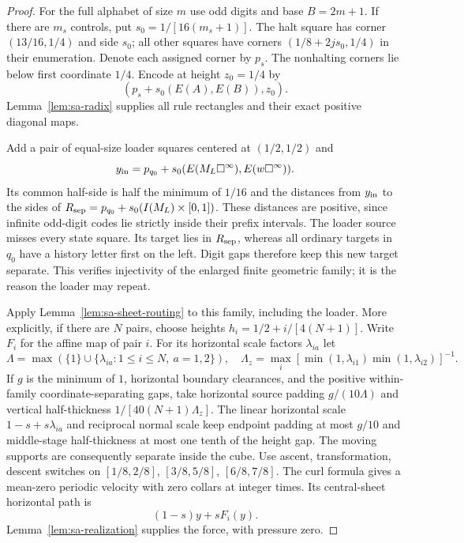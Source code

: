\begin{proof}
For the full alphabet of size $m$ use odd digits and base $B=2m+1$.
If there are $m_s$ controls, put $s_0=1/[16(m_s+1)]$.
The halt square has corner $(13/16,1/4)$ and side $s_0$; all other
squares have corners $(1/8+2js_0,1/4)$ in their enumeration.  Denote
each assigned corner by $p_s$. The nonhalting corners lie
below first coordinate $1/4$.  Encode at height $z_0=1/4$ by
\[
 (p_s+s_0(E(A),E(B)),z_0).
\]
Lemma~\ref{lem:sa-radix} supplies all rule rectangles and their exact
positive diagonal maps.

Add a pair of equal-size loader squares centered at $(1/2,1/2)$ and
\[
 y_{\rm in}=p_{q_0}+s_0
       (E(M_L\square^\infty),E(w\square^\infty)).
\]
Its common half-side is half the minimum of $1/16$ and the distances
from $y_{\rm in}$ to the sides of
$R_{\rm sep}=p_{q_0}+s_0(I(M_L)\times[0,1])$.
These distances are positive, since infinite odd-digit codes lie strictly
inside their prefix intervals.  The loader source misses every state
square.  Its target lies in $R_{\rm sep}$, whereas all ordinary targets
in $q_0$ have a history letter first on the left.  Digit gaps therefore
keep this new target separate.  This verifies injectivity of the enlarged
finite geometric family; it is the reason the loader may repeat.

Apply Lemma~\ref{lem:sa-sheet-routing} to this family, including the
loader.  More explicitly, if there are $N$ pairs, choose heights
$h_i=1/2+i/[4(N+1)]$.  Write $F_i$ for the affine map of pair $i$.  For its horizontal scale
factors $\lambda_{ia}$ let
\[
 \Lambda=\max(\{1\}\cup\{\lambda_{ia}:1\le i\le N,\ a=1,2\}),\quad
 \Lambda_z=\max_i[\min(1,\lambda_{i1})\min(1,\lambda_{i2})]^{-1}.
\]
If $g$ is the minimum of $1$, horizontal boundary clearances, and the
positive within-family coordinate-separating gaps, take horizontal
source padding $g/(10\Lambda)$ and vertical half-thickness
$1/[40(N+1)\Lambda_z]$.
The linear horizontal scale $1-s+s\lambda_{ia}$ and reciprocal normal
scale keep endpoint padding at most $g/10$ and middle-stage half-thickness
at most one tenth of the height gap.  The moving supports are consequently
separate inside the cube.  Use ascent, transformation, descent switches
on $[1/8,2/8]$, $[3/8,5/8]$, $[6/8,7/8]$.
The curl formula gives a mean-zero periodic velocity with zero collars
at integer times.  Its central-sheet horizontal path is
\begin{equation}\label{eq:sa-loader-convex-path}
       (1-s)y+sF_i(y).
\end{equation}
Lemma~\ref{lem:sa-realization} supplies the force, with pressure zero.


\end{proof}
